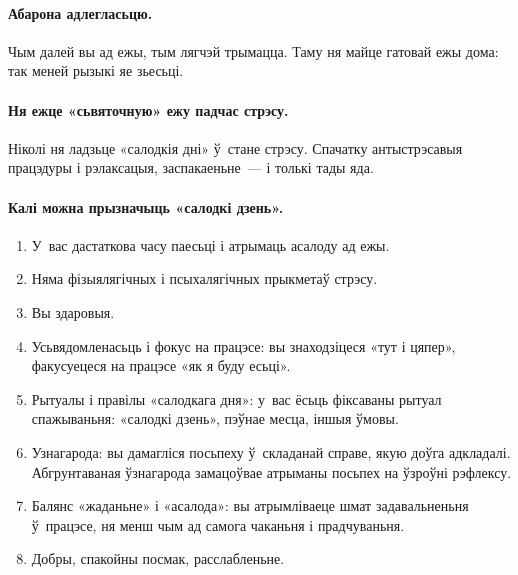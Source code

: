 
\paragraph{Абарона адлегласьцю.}
Чым далей вы ад ежы, тым лягчэй трымацца. Таму ня майце гатовай ежы дома: так меней рызыкі яе зьесьці.

\paragraph{Ня ежце «сьвяточную» ежу падчас стрэсу.}
Ніколі ня ладзьце «салодкія дні» ў~стане стрэсу. Спачатку антыстрэсавыя працэдуры і рэлаксацыя, заспакаеньне~--- і толькі тады яда.

\paragraph{Калі можна прызначыць «салодкі дзень».}
\begin{enumerate}[itemindent=3em,labelwidth=1.5em,leftmargin=0pt,nosep]
  \item У~вас дастаткова часу паесьці і атрымаць асалоду ад ежы.
  \item Няма фізыялягічных і псыхалягічных прыкметаў стрэсу.
  \item Вы здаровыя.
  \item Усьвядомленасьць і фокус на працэсе: вы знаходзіцеся «тут і цяпер», факусуецеся на працэсе «як я буду есьці».
  \item Рытуалы і правілы «салодкага дня»: у~вас ёсьць фіксаваны рытуал спажываньня: «салодкі дзень», пэўнае месца, іншыя ўмовы.
  \item Узнагарода: вы дамагліся посьпеху ў~складанай справе, якую доўга адкладалі. Абгрунтаваная ўзнагарода замацоўвае атрыманы посьпех на ўзроўні рэфлексу.
  \item Балянс «жаданьне» і «асалода»: вы атрымліваеце шмат задавальненьня ў~працэсе, ня менш чым ад самога чаканьня і прадчуваньня.
  \item Добры, спакойны посмак, расслабленьне.
\end{enumerate}

